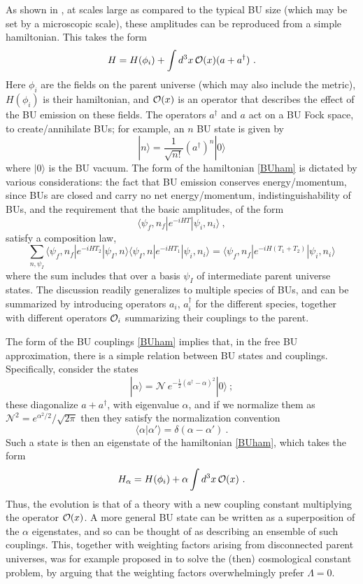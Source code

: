 \documentclass[11pt]{article}
\numberwithin{equation}{section}
\newcommand{\calo}{{\cal O}}
\newcommand{\beq}{\begin{equation}}
\newcommand{\eeq}{\end{equation}}
\begin{document}
As shown in \cite{Cole,GiStInc}, at scales large as compared to the typical BU size (which may be set by a microscopic scale), these amplitudes can be reproduced from a simple hamiltonian.  This takes the form
\beq\label{BUham}
H= H(\phi_i) + \int d^3x\, \calo(x) (a+a^\dagger)\ .
\eeq
Here $\phi_i$ are the fields on the parent universe (which may also include the metric), $H(\phi_i)$ is their hamiltonian, and $\calo(x)$ is an operator that describes the effect of the BU emission on these fields.  The operators $a^\dagger$ and $a$ act on a BU Fock space, to create/annihilate BUs; for example, an $n$ BU state
is given by
\beq
|n\rangle = \frac{1}{\sqrt{n!}} (a^\dagger)^n |0\rangle
\eeq
where $|0\rangle$ is the BU vacuum.  The form of the hamiltonian \eqref{BUham} is dictated by various considerations: the fact that BU emission conserves energy/momentum, since BUs are closed and carry no net energy/momentum, indistinguishability of BUs, and the requirement that the basic amplitudes, of the form
\beq
\langle \psi_f,n_f|e^{-i HT}|\psi_i,n_i\rangle\ ,
\eeq
satisfy a composition law,
\beq
\sum_{n, \psi_I}\langle\psi_f,n_f |e^{-iHT_2}|\psi_I,n\rangle\langle \psi_I,n|e^{-iHT_1}|\psi_i, n_i\rangle = \langle\psi_f,n_f |e^{-iH(T_1+T_2)}|\psi_i, n_i\rangle
\eeq
where the sum includes that over a basis $\psi_I$ of intermediate parent universe states.
The discussion readily generalizes to multiple species of BUs, and can be summarized by introducing operators $a_i,\, a^\dagger_i$ for the different species, together with different operators $\calo_i$ summarizing their couplings to the parent.

The  form of the BU couplings \eqref{BUham} implies that, in the free BU approximation, there is a simple relation between BU states and couplings.  Specifically, consider the states 
\beq
|\alpha\rangle = \mathcal{N}~e^{-\frac{1}{2}(a^\dagger - \alpha )^2} |0\rangle\ ;
\eeq
these diagonalize $a+a^\dagger$, with eigenvalue $\alpha$, and if we normalize them as $\mathcal{N}^2=e^{\alpha^2/2}/\sqrt{2\pi}$ then they satisfy the normalization convention
\beq
\langle \alpha|\alpha'\rangle = \delta(\alpha - \alpha')\ .
\eeq
Such a state is then an eigenstate of the hamiltonian  \eqref{BUham}, which takes the form
\beq
H_\alpha= H(\phi_i) + \alpha \int d^3x\, \calo(x)\ .
\eeq
Thus, the evolution is that of a theory with a new coupling constant multiplying the operator $\calo(x)$.  A more general BU state can be written as a superposition of the $\alpha$ eigenstates, and so can be thought of as describing an ensemble of such couplings.  This, together with weighting factors arising from disconnected parent universes, was for example proposed in \cite{ColeCC} to solve the (then) cosmological constant problem, by arguing that the weighting factors overwhelmingly prefer $\Lambda=0$.  
\end{document}
